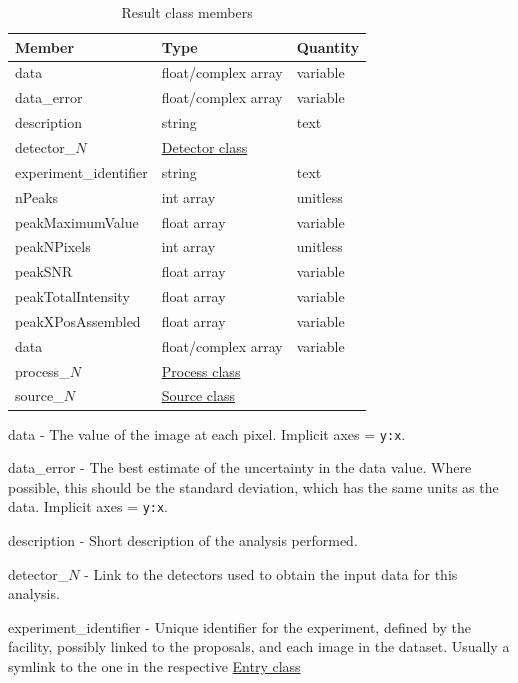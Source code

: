 \documentclass[usletter,11pt]{article}
\newcommand{\member}[2]
{ \noindent
{ \color{softBlue}  #1 - } #2
\vspace{0.2cm}
}
\begin{document}
\begin{table}[h!]\sffamily \footnotesize
\caption{Result class members}

\begin{tabular}{p{4.5cm} p{4.5cm}  p{2.5cm} }

\toprule
\bfseries Member     & \bfseries Type & \bfseries Quantity \\
\midrule
data &  float/complex array & variable \\
data\_error & float/complex array & variable \\
description & string & text \\
detector\_$N$ &  \hyperref[table:detector]{Detector class} & \\
experiment\_identifier & string  & text \\
nPeaks & int array & unitless \\
peakMaximumValue & float array & variable \\
peakNPixels & int array & unitless \\
peakSNR & float array & variable \\
peakTotalIntensity & float array & variable \\
peakXPosAssembled & float array & variable \\
data &  float/complex array & variable \\
process\_$N$ &  \hyperref[table:process]{Process class} & \\
source\_$N$ &  \hyperref[table:source]{Source class} & \\
\bottomrule
\end{tabular}
\end{table}

\member{data}{The value of the image at each pixel. Implicit axes = {\tt y:x}.}

\member{data\_error}{The best estimate of the uncertainty in the data
 value. Where possible, this should be the standard deviation, which
 has the same units as the data. Implicit axes = {\tt y:x}.}

\member{description}{Short description of the analysis performed.}

\member{detector\_$N$}{Link to the detectors used to obtain the input data for this
analysis.}

\member{experiment\_identifier}{Unique identifier for the experiment,
defined by the facility, possibly linked to the proposals, and each image in the
dataset. Usually a symlink to the one in the respective \hyperref[table:entry]{Entry class}}
\end{document}
